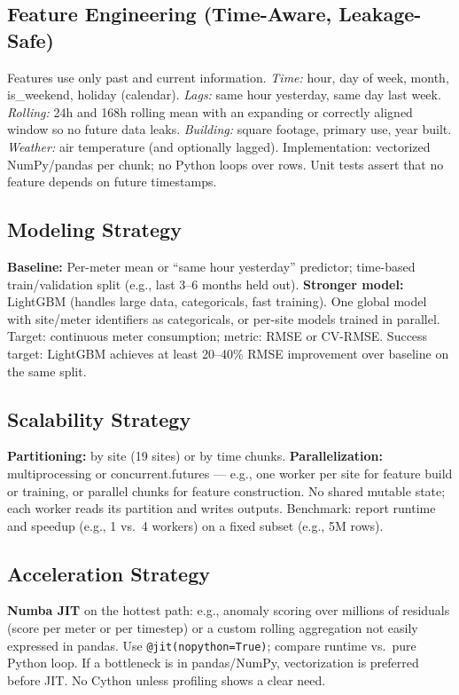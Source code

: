 \subsection{Feature Engineering (Time-Aware, Leakage-Safe)}
Features use only past and current information. \textit{Time:} hour, day of week, month, is\_weekend, holiday (calendar). \textit{Lags:} same hour yesterday, same day last week. \textit{Rolling:} 24h and 168h rolling mean with an expanding or correctly aligned window so no future data leaks. \textit{Building:} square footage, primary use, year built. \textit{Weather:} air temperature (and optionally lagged). Implementation: vectorized NumPy/pandas per chunk; no Python loops over rows. Unit tests assert that no feature depends on future timestamps.

\subsection{Modeling Strategy}
\textbf{Baseline:} Per-meter mean or ``same hour yesterday'' predictor; time-based train/validation split (e.g., last 3--6 months held out). \textbf{Stronger model:} LightGBM (handles large data, categoricals, fast training). One global model with site/meter identifiers as categoricals, or per-site models trained in parallel. Target: continuous meter consumption; metric: RMSE or CV-RMSE. Success target: LightGBM achieves at least 20--40\% RMSE improvement over baseline on the same split.

\subsection{Scalability Strategy}
\textbf{Partitioning:} by site (19 sites) or by time chunks. \textbf{Parallelization:} multiprocessing or concurrent.futures --- e.g., one worker per site for feature build or training, or parallel chunks for feature construction. No shared mutable state; each worker reads its partition and writes outputs. Benchmark: report runtime and speedup (e.g., 1 vs.\ 4 workers) on a fixed subset (e.g., 5M rows).

\subsection{Acceleration Strategy}
\textbf{Numba JIT} on the hottest path: e.g., anomaly scoring over millions of residuals (score per meter or per timestep) or a custom rolling aggregation not easily expressed in pandas. Use \texttt{@jit(nopython=True)}; compare runtime vs.\ pure Python loop. If a bottleneck is in pandas/NumPy, vectorization is preferred before JIT. No Cython unless profiling shows a clear need.

